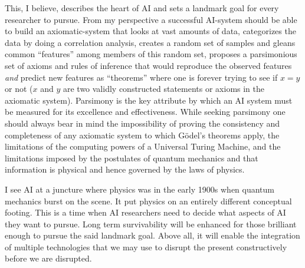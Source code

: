 \begin{multicols}{2}
This, I believe, describes the heart of AI and sets a landmark goal for every researcher to pursue. From my perspective a successful AI-system should be able to build an axiomatic-system that looks at vast amounts of data, categorizes the data by doing a correlation analysis, creates a random set of samples and gleans common ``features'' among members of this random set, proposes a parsimonious set of axioms and rules of inference that would reproduce the observed features \textit{and} predict new features as ``theorems'' where one is forever trying to see if $x = y$ or not ($x$ and $y$ are two validly constructed statements or axioms in the axiomatic system).  Parsimony is the key attribute by which an AI system must be measured for its excellence and effectiveness. While seeking parsimony one should always bear in mind the impossibility of proving the consistency and completeness of any axiomatic system to which Gödel's theorems apply, the limitations of the computing powers of a Universal Turing Machine, and the limitations imposed by the postulates of quantum mechanics and that information is physical and hence governed by the laws of physics.

I see AI at a juncture where physics was in the early 1900s when quantum mechanics burst on the scene. It put physics on an entirely different conceptual footing. This is a time when AI researchers need to decide what aspects of AI they want to pursue. Long term survivability will be enhanced for those brilliant enough to pursue the said landmark goal. Above all, it will enable the integration of multiple technologies that we may use to disrupt the present constructively before we are disrupted.


\end{multicols}
